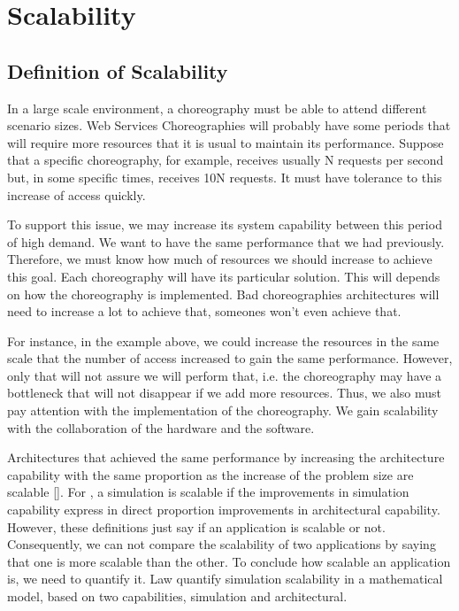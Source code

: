 \section{Scalability}

\subsection{Definition of Scalability}
In a large scale environment, a choreography must be able to attend different scenario sizes. Web Services Choreographies will probably have some periods that will require more resources that it is usual to maintain its performance.  Suppose that a specific choreography, for example, receives usually N requests per second but, in some specific times, receives 10N requests. It must have tolerance to this increase of access quickly.

To support this issue, we may increase its system capability between this period of high demand. We want to have the same performance that we had previously. Therefore, we must know how much of resources we should increase to achieve this goal.  Each choreography will have its particular solution. This will depends on how the choreography is implemented. Bad choreographies architectures will need to increase a lot to achieve that, someones won't even achieve that.

For instance, in the example above, we could increase the resources in the same scale that the number of access increased to gain the same performance. However, only that will not assure we will perform that, i.e.  the choreography may have a bottleneck that will not disappear if we add more resources. Thus, we also must pay attention with the implementation of the choreography. We gain scalability with the collaboration of the hardware and the software. 

Architectures that achieved the same performance by increasing the architecture capability with the same proportion as the increase of the problem size are scalable [\citet{QUINN}]. For \citet{LAW}, a simulation is scalable if the improvements in simulation capability express in direct proportion improvements in architectural capability. However, these definitions just say if an application is scalable or not. Consequently, we can not compare the scalability of two applications by saying that one is more scalable than the other. To conclude how scalable an application is, we need to quantify it. Law quantify simulation scalability in a mathematical model, based on two capabilities, simulation and architectural. 

